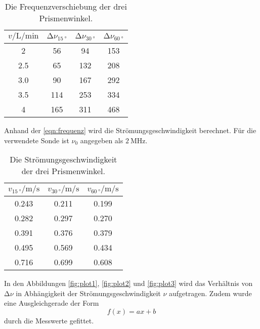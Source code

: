 \begin{table}[H]
    \centering
    \caption{Die Frequenzverschiebung der drei Prismenwinkel.}
    \label{tab:messwerte1}
\begin{tabular}{c c c c}
    \toprule
     $v / \si{\liter\per\minute}$ & $ \increment \nu_{\qty{15}{°}}$ & $\increment \nu_{\qty{30}{°}}$ & $\increment \nu_{\qty{60}{°}}$ \\
    \midrule
       2 &  56 &  94 & 153 \\
     2.5 &  65 & 132 & 208 \\
     3.0 &  90 & 167 & 292 \\
     3.5 & 114 & 253 & 334 \\
       4 & 165 & 311 & 468 \\
    \bottomrule
\end{tabular}
\end{table}

Anhand der \autoref{eqn:frequenz} wird die Strömungsgeschwindigkeit berechnet. Für die verwendete Sonde ist 
$\nu_0$ angegeben als $\SI{2}{\mega\hertz}$.

\begin{table}[H]
    \centering
    \caption{Die Strömungsgeschwindigkeit der drei Prismenwinkel.}
    \label{tab:geschw}
\begin{tabular}{c c c}
    \toprule
     $v_{\qty{15}{°}} / \si{\meter \per \second}$ &  $v_{\qty{30}{°}} / \si{\meter \per \second}$ &  $v_{\qty{60}{°}} / \si{\meter \per \second}$ \\
    \midrule
       0.243 &    0.211 &    0.199 \\
       0.282 &    0.297 &    0.270 \\
       0.391 &    0.376 &    0.379 \\
       0.495 &    0.569 &    0.434 \\
       0.716 &    0.699 &    0.608 \\
    \bottomrule
    \end{tabular}
\end{table}

In den Abbildungen \ref{fig:plot1}, \ref{fig:plot2} und \ref{fig:plot3} wird das Verhältnis von $\increment \nu$ in Abhängigkeit der Strömungsgeschwindigkeit
$\nu$ aufgetragen. Zudem wurde eine Ausgleichgerade der Form 
\begin{equation*}
  f(x) =a x + b 
\end{equation*}
durch die Messwerte gefittet.

